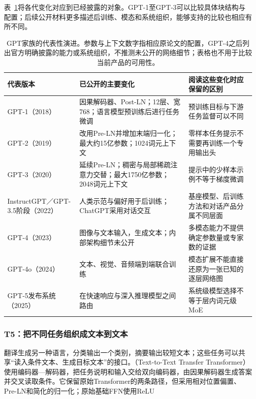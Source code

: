表~\ref{tab:transformer-gpt-generations}将各代变化对应到已经披露的对象。GPT-1至GPT-3可以比较具体块结构与配置；后续公开材料更多描述后训练、模态和系统组织，能够支持的比较也相应有所不同。

\begin{table}[htbp]
  \centering
  \small
  \begin{tabular}{@{}p{25mm}p{64mm}p{66mm}@{}}
    \toprule
    代表版本 & 已公开的主要变化 & 阅读这些变化时应保留的区别 \\
    \midrule
    GPT-1（2018） & 因果解码器、Post-LN；12层、宽768；语言模型预训练后进行任务微调 & 预训练目标与下游任务监督可以不同 \\
    GPT-2（2019） & 改用Pre-LN并增加末端归一化；最大约15亿参数；1024词元上下文 & 零样本任务提示不需要再训练一个专用输出头 \\
    GPT-3（2020） & 延续Pre-LN；稠密与局部稀疏注意力交替；最大1750亿参数；2048词元上下文 & 提示中的少样本示例不等于梯度微调 \\
    InstructGPT／GPT-3.5阶段（2022） & 人类示范与偏好用于后训练；ChatGPT采用对话交互 & 基座模型、后训练方法和对话产品分属不同层面 \\
    GPT-4（2023） & 图像与文本输入，生成文本；内部架构细节未公开 & 多模态能力不提供确定参数量或专家数的证据 \\
    GPT-4o（2024） & 文本、视觉、音频端到端联合训练 & 模态扩展不能直接还原为一张已知的逐层网络图 \\
    GPT-5发布系统（2025） & 在快速响应与深入推理模型之间路由 & 系统级模型选择不等于层内词元级MoE \\
    \bottomrule
  \end{tabular}
  \caption{GPT家族的代表性演进。参数与上下文数字指相应原论文的配置，GPT-4之后列出官方明确披露的能力或系统组织，不推测未公开的网络细节；表格也不用于比较当前产品的可用性。}
  \label{tab:transformer-gpt-generations}
\end{table}

\subsubsection{T5：把不同任务组织成文本到文本}

翻译生成另一种语言，分类输出一个类别，摘要输出较短文本；这些任务可以共享“读入条件文本、生成目标文本”的接口。（Text-to-Text Transfer Transformer）使用编码器—解码器，把任务说明和输入交给双向编码器，由因果解码器生成答案并交叉读取条件。它保留原始Transformer的两条路径，但采用相对位置偏置、Pre-LN和简化的归一化；原始基础FFN使用ReLU

